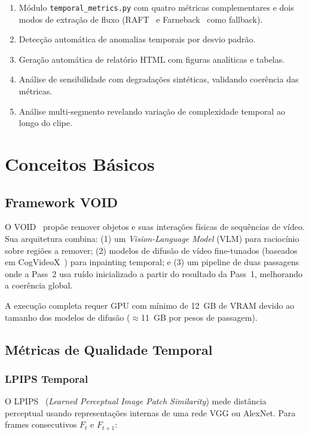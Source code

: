 \documentclass[conference]{IEEEtran}
\begin{document}
\begin{enumerate}
    \item Módulo \texttt{temporal\_metrics.py} com quatro métricas complementares e dois modos de extração de fluxo (RAFT~\cite{raft} e Farneback~\cite{szeliski} como fallback).
    \item Detecção automática de anomalias temporais por desvio padrão.
    \item Geração automática de relatório HTML com figuras analíticas e tabelas.
    \item Análise de sensibilidade com degradações sintéticas, validando coerência das métricas.
    \item Análise multi-segmento revelando variação de complexidade temporal ao longo do clipe.
\end{enumerate}

\section{Conceitos Básicos}

\subsection{Framework VOID}

O VOID~\cite{void, voidrepo} propõe remover objetos e suas interações físicas de sequências de vídeo. Sua arquitetura combina: (1) um \textit{Vision-Language Model} (VLM) para raciocínio sobre regiões a remover; (2) modelos de difusão de vídeo fine-tunados (baseados em CogVideoX~\cite{cogvideox}) para inpainting temporal; e (3) um pipeline de duas passagens onde a Pass~2 usa ruído inicializado a partir do resultado da Pass~1, melhorando a coerência global.

A execução completa requer GPU com mínimo de 12~GB de VRAM devido ao tamanho dos modelos de difusão (\(\approx\)11~GB por pesos de passagem).

\subsection{Métricas de Qualidade Temporal}

\subsubsection{LPIPS Temporal}

O LPIPS~\cite{lpips} (\textit{Learned Perceptual Image Patch Similarity}) mede distância perceptual usando representações internas de uma rede VGG ou AlexNet. Para frames consecutivos $F_t$ e $F_{t+1}$:
\end{document}
